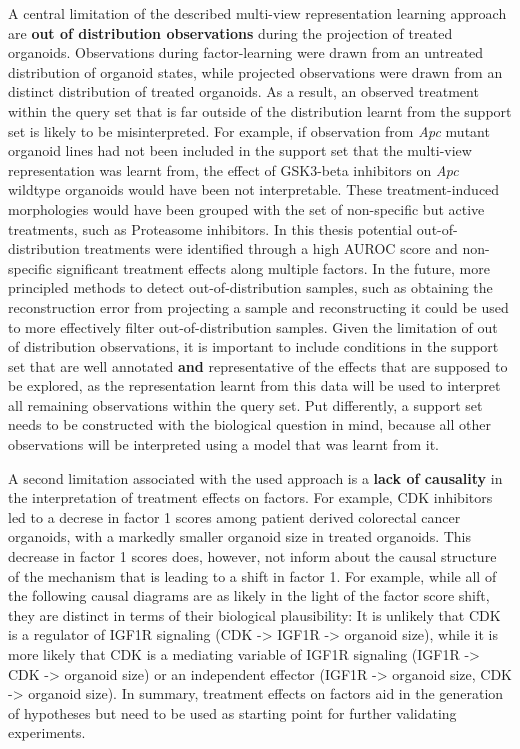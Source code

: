 \begin{flushleft}
A central limitation of the described multi-view representation learning approach are \textbf{out of distribution observations} during the projection of treated organoids. Observations during factor-learning were drawn from an untreated distribution of organoid states, while projected observations were drawn from an distinct distribution of treated organoids. As a result, an observed treatment within the query set that is far outside of the distribution learnt from the support set is likely to be misinterpreted. For example, if observation from \textit{Apc} mutant organoid lines had not been included in the support set that the multi-view representation was learnt from, the effect of GSK3-beta inhibitors on \textit{Apc} wildtype organoids would have been not interpretable. These treatment-induced morphologies would have been grouped with the set of non-specific but active treatments, such as Proteasome inhibitors. In this thesis potential out-of-distribution treatments were identified through a high AUROC score and non-specific significant treatment effects along multiple factors. In the future, more principled methods to detect out-of-distribution samples, such as obtaining the reconstruction error from projecting a sample and reconstructing it could be used to more effectively filter out-of-distribution samples. Given the limitation of out of distribution observations, it is important to include conditions in the support set that are well annotated \textbf{and} representative of the effects that are supposed to be explored, as the representation learnt from this data will be used to interpret all remaining observations within the query set. Put differently, a support set needs to be constructed with the biological question in mind, because all other observations will be interpreted using a model that was learnt from it.
\smallbreak

A second limitation associated with the used approach is a \textbf{lack of causality} in the interpretation of treatment effects on factors. For example, CDK inhibitors led to a decrese in factor 1 scores among patient derived colorectal cancer organoids, with a markedly smaller organoid size in treated organoids. This decrease in factor 1 scores does, however, not inform about the causal structure of the mechanism that is leading to a shift in factor 1. For example, while all of the following causal diagrams are as likely in the light of the factor score shift, they are distinct in terms of their biological plausibility: It is unlikely that CDK is a regulator of IGF1R signaling (CDK -> IGF1R -> organoid size), while it is more likely that CDK is a mediating variable of IGF1R signaling (IGF1R -> CDK -> organoid size) or an independent effector (IGF1R -> organoid size, CDK -> organoid size). In summary, treatment effects on factors aid in the generation of hypotheses but need to be used as starting point for further validating experiments.
\smallbreak


\end{flushleft}
